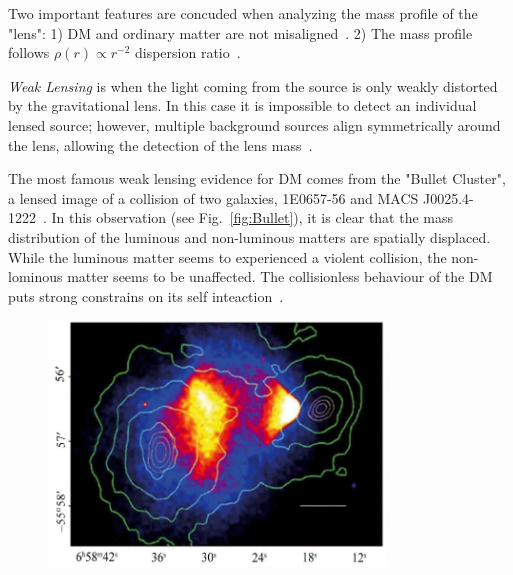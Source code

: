 Two important features are concuded when analyzing the mass profile of the "lens": 1) DM and ordinary matter are not misaligned~\cite{Ferreras:2007na}. 2) The mass profile follows $\rho(r)\propto r^{-2}$ dispersion ratio~\cite{Gavazzi:2007vw}. 

\textit{Weak Lensing} is when the light coming from the source is only weakly distorted by the gravitational lens. In this case it is impossible to detect an individual lensed source; however, multiple background sources align symmetrically around the lens, allowing the detection of the lens mass~\cite{Kaiser:1992ps}.

The most famous weak lensing evidence for DM comes from the "Bullet Cluster", a lensed image of a collision of two galaxies, 1E0657-56 and MACS J0025.4-1222~\cite{Clowe:2006eq}. In this observation (see Fig.~\ref{fig:Bullet}), it is clear that the mass distribution of the luminous and non-luminous matters are spatially displaced. While the luminous matter seems to experienced a violent collision, the non-lominous matter seems to be unaffected. The collisionless behaviour of the DM puts strong constrains on its self inteaction~\cite{Randall:2007ph}. 

 \begin{figure}[]
	\centering
	\includegraphics[width=0.8\textwidth]{figs/bulletCluster.jpg}
	\label{fig:emissionType}
\end{figure}  



